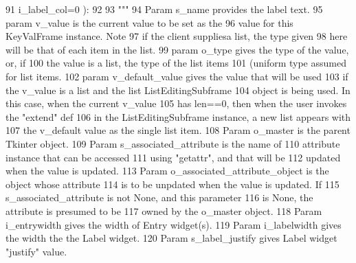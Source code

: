 \begin{DoxyCode}
91                     i\_label\_col=0 ):
92         
93         \textcolor{stringliteral}{"""}
94 \textcolor{stringliteral}{        Param s\_name provides the label text.}
95 \textcolor{stringliteral}{        param v\_value is the current value to be set as the}
96 \textcolor{stringliteral}{                value for this KeyValFrame instance.  Note}
97 \textcolor{stringliteral}{                if the client suppliesa list, the type given}
98 \textcolor{stringliteral}{                here will be that of each item in the list.}
99 \textcolor{stringliteral}{        param o\_type gives the type of the value, or, if}
100 \textcolor{stringliteral}{                the value is a list, the type of the list items}
101 \textcolor{stringliteral}{                (uniform type assumed for list items.}
102 \textcolor{stringliteral}{        param v\_default\_value gives the value that will be used}
103 \textcolor{stringliteral}{                if the v\_value is a list and the list ListEditingSubframe}
104 \textcolor{stringliteral}{                object is being used.  In this case, when the current v\_value}
105 \textcolor{stringliteral}{                has len==0, then when the user invokes the "extend" def}
106 \textcolor{stringliteral}{                in the ListEditingSubframe instance, a new list appears with}
107 \textcolor{stringliteral}{                the v\_default value as the single list item.}
108 \textcolor{stringliteral}{        Param o\_master is the parent Tkinter object.}
109 \textcolor{stringliteral}{        Param s\_associated\_attribute is the name of }
110 \textcolor{stringliteral}{            attribute instance that can be accessed}
111 \textcolor{stringliteral}{            using "getattr", and that will be}
112 \textcolor{stringliteral}{            updated when the value is updated.}
113 \textcolor{stringliteral}{        Param o\_associated\_attribute\_object is the object whose attribute}
114 \textcolor{stringliteral}{            is to be unpdated when the value is updated.  If}
115 \textcolor{stringliteral}{            s\_associated\_attribute is not None, and this parameter}
116 \textcolor{stringliteral}{            is None, the attribute is presumed to be}
117 \textcolor{stringliteral}{            owned by the o\_master object.}
118 \textcolor{stringliteral}{        Param i\_entrywidth gives the width of Entry widget(s).}
119 \textcolor{stringliteral}{        Param i\_labelwidth gives the width the the Label widget.}
120 \textcolor{stringliteral}{        Param s\_label\_justify gives Label widget "justify" value.}

\end{DoxyCode}
